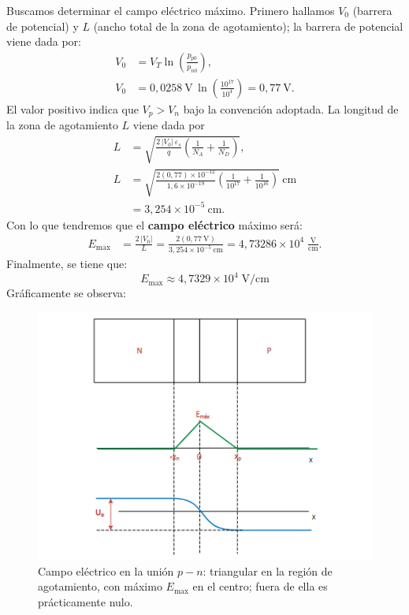 Buscamos determinar el campo eléctrico máximo. Primero hallamos \(V_0\) (barrera de potencial) y
\(L\) (ancho total de la zona de agotamiento); la barrera de potencial viene dada por:
\begin{align}
V_0 &= V_T \ln\!\left(\frac{p_{p0}}{p_{n0}}\right),\\
V_0 &= 0{,}0258~\text{V}\,\ln\!\left(\frac{10^{17}}{10^{4}}\right) = 0{,}77~\text{V}.
\end{align}
El valor positivo indica que \(V_p>V_n\) bajo la convención adoptada. La longitud de la zona de agotamiento \(L\) viene dada por
\begin{align}
L&=\sqrt{\frac{2\,|V_0|\,\varepsilon_s}{q}\!\left(\frac{1}{N_A}+\frac{1}{N_D}\right)},\\
L &= \sqrt{\frac{2(0{,}77)\times 10^{-12}}{1{,}6\times 10^{-19}}
\left(\frac{1}{10^{17}}+\frac{1}{10^{16}}\right)}~\text{cm} \\
  &= 3{,}254\times 10^{-5}~\text{cm}.
\end{align}
Con lo que tendremos que el \textbf{campo eléctrico} máximo será:
\begin{align}
E_{\max}&=\frac{2\,|V_0|}{L}
= \frac{2(0{,}77~\text{V})}{3{,}254\times 10^{-5}~\text{cm}}
= 4{,}73286\times 10^{4}\;\frac{\text{V}}{\text{cm}}.
\end{align}
Finalmente, se tiene que:
\begin{equation}
\boxed{\,E_{\max}\approx 4{,}7329\times 10^{4}\; \text{V/cm}\,}
\end{equation}
Gráficamente se observa:
\begin{figure}
    \centering
    \includegraphics[scale=1]{img/P1_7.png}
    \caption{Campo eléctrico en la unión \(p\!-\!n\): triangular en la región de agotamiento, con máximo \(E_{\max}\) en el centro; fuera de ella es prácticamente nulo.}
\end{figure}
